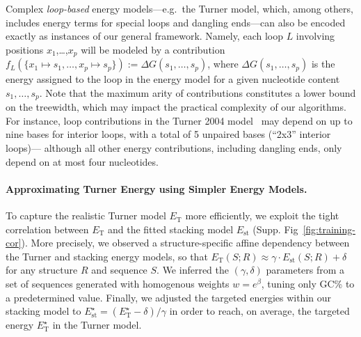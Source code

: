 \documentclass[]{bmcart}
\newcommand{\Def}[1]{\emph{#1}}
\newcommand{\Nuc}[1]{{\sf #1}}
\newcommand{\Cb}{\Nuc{C}}
\newcommand{\Gb}{\Nuc{G}}
\newcommand{\GCb}{\Gb\Cb}
\newcommand{\EnergyTurner}{E_{\text{T}}}
\newcommand{\EnergyStacking}{E_{\text{st}}}
\newcommand{\citep}[1]{\cite{#1}}
\begin{document}
Complex \Def{loop-based}
 energy models---e.g.~the Turner model,
which, among others, includes energy terms for special loops and dangling
ends---can also be encoded exactly as instances of our general framework. Namely, each loop $L$ involving positions $x_1$,\ldots,$x_p$ will be modeled by a contribution $f_L(\{x_1\mapsto s_1,\ldots, x_p\mapsto s_p\}):=\Delta G(s_1,\ldots,s_p)$, where $\Delta G(s_1,\ldots,s_p)$ is the energy assigned to the loop in the energy model for a given nucleotide content $s_1,\ldots,s_p$. Note that the maximum arity of contributions constitutes a lower bound on the treewidth, which may impact the practical complexity of our algorithms. For instance, loop contributions in the Turner 2004 model~\citep{Turner2009} may depend on up to
nine bases for interior loops, with a total of 5 unpaired bases (``2x3'' interior loops)--- although all other energy contributions, including dangling ends, only depend on at most four nucleotides.




\paragraph{Approximating Turner Energy using Simpler Energy Models.}
To capture the realistic Turner model $\EnergyTurner$ more efficiently, we exploit the tight correlation between
$\EnergyTurner$ and the fitted stacking model $\EnergyStacking$
(Supp. Fig~\ref{fig:training-cor}). More precisely, we observed a
structure-specific affine dependency between the Turner and stacking
energy models, so that
$\EnergyTurner(S;R) \approx \gamma\cdot \EnergyStacking(S;R) + \delta$
for any structure $R$ and sequence $S$. We inferred the
$(\gamma,\delta)$ parameters from a set of sequences generated with
homogenous weights $w=e^{\beta}$, tuning only \GCb\% to a
predetermined value.  Finally, we adjusted the targeted energies
within our stacking model to
$\EnergyStacking^{\star} = (\EnergyTurner^{\star}- \delta)/\gamma$ in
order to reach, on average, the targeted energy
$\EnergyTurner^{\star}$ in the Turner model.
\end{document}
